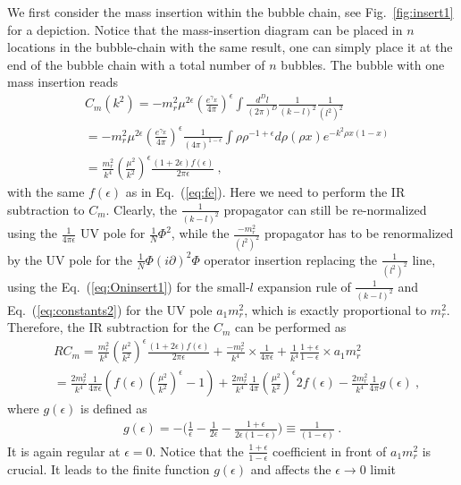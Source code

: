 \documentclass[a4paper,11pt]{article}
\begin{document}
We first consider the mass insertion within the bubble chain, see Fig.~\ref{fig:insert1} for a depiction. Notice that the mass-insertion diagram can be placed in $n$ locations in the bubble-chain with the same result, one can simply place it at the end of the bubble chain with a total number of $n$ bubbles. The bubble with one mass insertion reads
\begin{align}
& C_{m}(k^2)=-m_r^2\mu^{2\epsilon}\left(\frac{e^{\gamma_E}}{4\pi}\right)^{\epsilon}\int\frac{d^Dl}{(2\pi)^D}\frac{1}{(k-l)^2}\frac{1}{(l^2)^2}\nonumber \\
&=-m_r^2\mu^{2\epsilon}\left(\frac{e^{\gamma_E}}{4\pi}\right)^{\epsilon}\frac{1}{(4\pi)^{1-\epsilon}}\int \rho \rho^{-1+\epsilon} d\rho (\rho x)e^{-k^2\rho x(1-x)} \nonumber \\ 
&=\frac{m_r^2}{ k^4}\left(\frac{\mu^2}{k^2}\right)^{\epsilon}\frac{(1+2\epsilon)f(\epsilon)}{2\pi \epsilon} \ ,
\end{align}
with the same $f(\epsilon)$ as in Eq.~(\ref{eq:fe}). Here we need to perform the IR subtraction to $C_m$. Clearly, the $\frac{1}{(k-l)^2}$ propagator can still be re-normalized using the $\frac{1}{4\pi \epsilon}$ UV pole for $\frac{1}{N}\Phi^2$, while the $\frac{-m_r^2}{(l^2)^2}$ propagator has to be renormalized by the UV pole for the $\frac{1}{N}\Phi(i\partial)^2\Phi$ operator insertion replacing the $\frac{1}{(l^2)^2}$ line, using the Eq.~(\ref{eq:Oninsert1}) for the small-$l$ expansion rule of $\frac{1}{(k-l)^2}$ and Eq.~(\ref{eq:constants2}) for the UV pole $a_1m_r^2$, which is exactly proportional to $m_r^2$. Therefore, the IR subtraction for the $C_m$ can be performed as
\begin{align}\label{eq:Cm}
&RC_m=\frac{m_r^2}{k^4}\left(\frac{\mu^2}{k^2}\right)^{\epsilon}\frac{(1+2\epsilon)f(\epsilon)}{2\pi\epsilon}+\frac{-m_r^2}{k^4}\times\frac{1}{4\pi\epsilon}+\frac{1}{k^4}\frac{1+\epsilon}{1-\epsilon}\times a_1m_r^2\nonumber \\ 
&=\frac{2m_r^2}{k^4}\frac{1}{4\pi\epsilon}\left(f(\epsilon)\left(\frac{\mu^2}{k^2}\right)^{\epsilon}-1\right)+\frac{2m_r^2}{k^4}\frac{1}{4\pi}\left(\frac{\mu^2}{k^2}\right)^{\epsilon}2f(\epsilon)-\frac{2m_r^2}{k^4}\frac{1}{4\pi}g(\epsilon) \ ,
\end{align}
where $g(\epsilon)$ is defined as 
\begin{align}
g(\epsilon)=-\bigg(\frac{1}{\epsilon}-\frac{1}{2\epsilon}-\frac{1+\epsilon}{2\epsilon(1-\epsilon)}\bigg) \equiv \frac{1}{(1-\epsilon)} \ .
\end{align}
It is again regular at $\epsilon=0$. Notice that the $\frac{1+\epsilon}{1-\epsilon}$ coefficient in front of $a_1m_r^2$ is crucial. It leads to the finite function $g(\epsilon)$ and affects the $\epsilon \rightarrow 0$ limit
\end{document}
